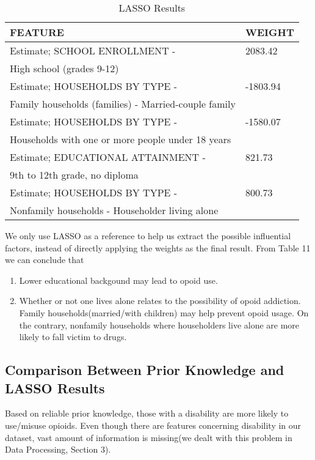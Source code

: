 \begin{table}[H]
	\centering
	\begin{tabular}{|l|l|}
		\hline
		\rowcolor[HTML]{656565} 
		{\color[HTML]{FFFFFF} \textbf{FEATURE}} & {\color[HTML]{FFFFFF} \textbf{WEIGHT}} \\ \hline
		
		Estimate; SCHOOL ENROLLMENT - 	&2083.42 \\ 
		High school (grades 9-12) & \\ \hline
		
		Estimate; HOUSEHOLDS BY TYPE - 	& -1803.94 \\
		Family households (families) - Married-couple family & \\ \hline
		Estimate; HOUSEHOLDS BY TYPE -  &	-1580.07  \\ Households with one or more people under 18 years &\\ \hline
		Estimate; EDUCATIONAL ATTAINMENT - 	& 821.73 \\ 
		9th to 12th grade, no diploma & \\ \hline
		Estimate; HOUSEHOLDS BY TYPE - & 	800.73 \\
		Nonfamily households - Householder living alone & \\ \hline
		
	\end{tabular}
	\centering
	\caption{LASSO Results}
\end{table}

We only use LASSO as a reference to help us extract the possible influential factors, instead of directly applying the weights as the final result. From Table 11 we can conclude that
\begin{enumerate}
	\item Lower educational backgound may lead to opoid use.
	\item Whether or not one lives alone relates to the possibility of opoid addiction. Family households(married/with children) may help prevent opoid usage. On the contrary, nonfamily households where householders live alone are more likely to fall victim to drugs.
\end{enumerate}

\subsection{Comparison Between Prior Knowledge and LASSO Results}
Based on reliable prior knowledge, those with a disability are more likely to use/misuse opioids. Even though there are features concerning disability in our dataset, vast amount of information is missing(we dealt with this problem in Data Processing, Section 3). 

